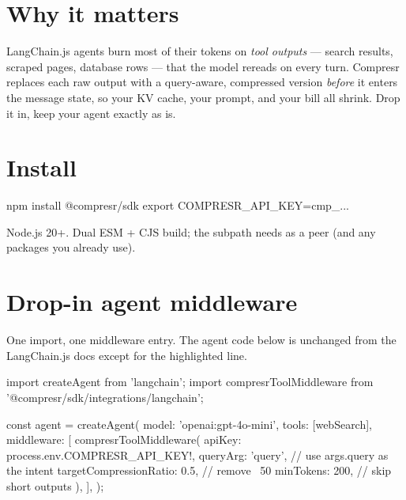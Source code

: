 \documentclass[10pt]{article}
\begin{document}

\section{Why it matters}

LangChain.js agents burn most of their tokens on \emph{tool outputs} —
search results, scraped pages, database rows — that the model rereads on
every turn. Compresr replaces each raw output with a query-aware,
compressed version \emph{before} it enters the message state, so your KV
cache, your prompt, and your bill all shrink. Drop it in, keep your agent
exactly as is.

\section{Install}

\begin{shcode}
npm install @compresr/sdk
export COMPRESR_API_KEY=cmp_...
\end{shcode}

\noindent Node.js 20+. Dual ESM + CJS build; the
 subpath needs
 as a peer (and any
 packages you already use).

\section{Drop-in agent middleware}

One import, one middleware entry. The agent code below is unchanged from
the LangChain.js docs except for the highlighted line.

\begin{tscode}
import { createAgent } from 'langchain';
import { compresrToolMiddleware } from '@compresr/sdk/integrations/langchain';

const agent = createAgent({
  model: 'openai:gpt-4o-mini',
  tools: [webSearch],
  middleware: [
    compresrToolMiddleware({
      apiKey: process.env.COMPRESR_API_KEY!,
      queryArg: 'query',            // use args.query as the intent
      targetCompressionRatio: 0.5,  // remove ~50%
      minTokens: 200,               // skip short outputs
    }),
  ],
});
\end{tscode}
\end{document}
